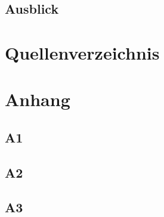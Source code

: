 \documentclass[ngerman,11pt,a4paper,titlepage]{article}
\begin{document}
		\subsection{Ausblick}
		\label{subsec:ausblick}
		\ausblickText
	\pagebreak
	
\section{Quellenverzeichnis}
\label{sec
}
\quellenverzeichnisText
\pagebreak

\section{Anhang}
\label{sec
}
\anhangText
		\subsection{A1}
		\label{subsec:a1}
		\anhangEins
		
		\subsection{A2}
		\label{subsec:a2}
		\anhangZwei
		
		\subsection{A3}
		\label{subsec:a3}
		\anhangDrei
	\pagebreak
	
\end{document}
